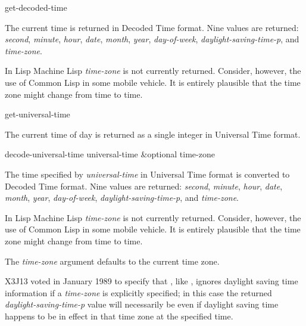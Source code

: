 \begin{defun}[Function]
get-decoded-time 

The current time is returned in Decoded Time format.  Nine values
are returned: {\it second}, {\it minute}, {\it hour}, {\it date}, {\it month},
{\it year}, {\it day-of-week}, {\it daylight-saving-time-p}, and {\it time-zone}.

\beforenoterule
\begin{incompatibility}
In Lisp Machine Lisp {\it time-zone} is not currently returned.
Consider, however, the use of Common Lisp in some mobile vehicle.
It is entirely plausible that the time zone might change from time to time.
\end{incompatibility}
\afternoterule
\end{defun}

\begin{defun}[Function]
get-universal-time 

The current time of day is returned as a single integer
in Universal Time format.
\end{defun}

\begin{defun}[Function]
decode-universal-time universal-time &optional time-zone

The time specified by {\it universal-time} in Universal Time format
is converted to Decoded Time format.  Nine values
are returned: {\it second}, {\it minute}, {\it hour}, {\it date}, {\it month},
{\it year}, {\it day-of-week}, {\it daylight-saving-time-p}, and {\it time-zone}.

\beforenoterule
\begin{incompatibility}
In Lisp Machine Lisp {\it time-zone} is not currently returned.
Consider, however, the use of Common Lisp in some mobile vehicle.
It is entirely plausible that the time zone might change from time to time.
\end{incompatibility}
\afternoterule

The {\it time-zone} argument defaults to the current time zone.
\begin{new}
X3J13 voted in January 1989
to specify that ,
like , ignores daylight saving time information
if a {\it time-zone} is explicitly specified; in this case
the returned {\it daylight-saving-time-p} value will necessarily be
 even if daylight saving time happens to be in effect in that
time zone at the specified time.
\end{new}
\end{defun}

